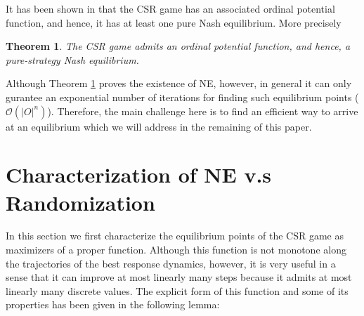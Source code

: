 \documentclass[conference, 10pt, twocolumn]{ieeeconf}
\newtheorem{theorem}{Theorem}
\begin{document}
It has been shown in \cite{gopalakrishnan2012cache} that the CSR game has an associated ordinal potential function, and hence, it has at least one pure Nash equilibrium. More precisely

\smallskip
\begin{theorem}\label{thm:existence-NE}
The CSR game admits an ordinal potential function, and hence, a pure-strategy Nash equilibrium.
\end{theorem}

Although Theorem \ref{thm:existence-NE} proves the existence of NE, however, in general it can only gurantee an exponential number of iterations for finding such equilibrium points ($\mathcal{O}(|O|^n)$). Therefore, the main challenge here is to find an efficient way to arrive at an equilibrium which we will address in the remaining of this paper.

\section{Characterization of NE v.s Randomization}\label{sec:main-I}

In this section we first characterize the equilibrium points of the CSR game as maximizers of a proper function. Although this function is not monotone along the trajectories of the best response dynamics, however, it is very useful in a sense that it can improve at most linearly many steps because it admits at most linearly many discrete values. The explicit form of this function and some of its properties has been given in the following lemma: 
\end{document}
